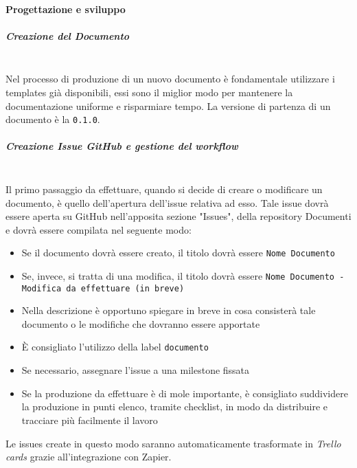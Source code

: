 \paragraph{Progettazione e sviluppo}
\subparagraph{Creazione del Documento}
\mbox{}\\
Nel processo di produzione di un nuovo documento è fondamentale utilizzare i templates già
disponibili, essi sono il miglior modo per mantenere la documentazione uniforme e
risparmiare tempo.
La versione di partenza di un documento è la \texttt{0.1.0}.

\subparagraph{Creazione Issue GitHub e gestione del workflow}
\mbox{}\\
Il primo passaggio da effettuare, quando si decide di creare o modificare un documento, è quello dell'apertura dell'issue relativa ad esso.
Tale issue dovrà essere aperta su GitHub nell'apposita sezione "Issues", della repository Documenti e dovrà essere compilata nel seguente modo:
\begin{itemize}
    \item Se il documento dovrà essere creato, il titolo dovrà essere
    \texttt{Nome Documento}
    \item Se, invece, si tratta di una modifica, il titolo dovrà essere
    \texttt{Nome Documento - Modifica da effettuare (in breve)}
    \item Nella descrizione è opportuno spiegare in breve in cosa consisterà tale documento o le modifiche che dovranno essere apportate
    \item È consigliato l'utilizzo della label \texttt{documento}
    \item Se necessario, assegnare l'issue a una milestone fissata
    \item Se la produzione da effettuare è di mole importante, è consigliato suddividere la produzione in punti elenco, tramite checklist, in modo da distribuire e tracciare più facilmente il lavoro
\end{itemize}

\noindent Le issues create in questo modo saranno automaticamente trasformate in \textit{Trello cards} grazie all'integrazione con Zapier. \\

